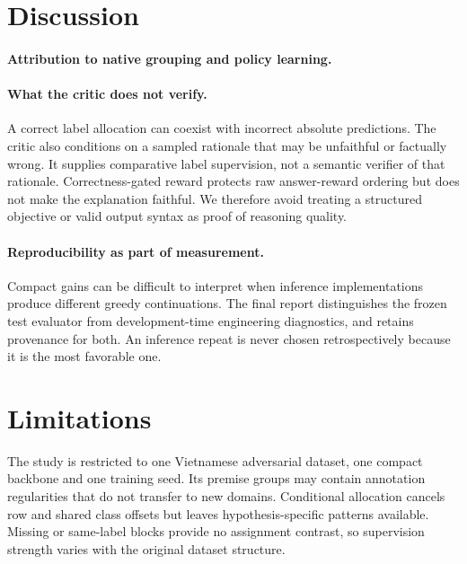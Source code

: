 \documentclass[11pt]{article}
\begin{document}
\section{Discussion}
\paragraph{Attribution to native grouping and policy learning.}

\paragraph{What the critic does not verify.}
A correct label allocation can coexist with incorrect absolute predictions. The critic also conditions on a sampled rationale that may be unfaithful or factually wrong. It supplies comparative label supervision, not a semantic verifier of that rationale. Correctness-gated reward protects raw answer-reward ordering but does not make the explanation faithful. We therefore avoid treating a structured objective or valid output syntax as proof of reasoning quality.

\paragraph{Reproducibility as part of measurement.}
Compact gains can be difficult to interpret when inference implementations produce different greedy continuations. The final report distinguishes the frozen test evaluator from development-time engineering diagnostics, and retains provenance for both. An inference repeat is never chosen retrospectively because it is the most favorable one.

\section{Limitations}
The study is restricted to one Vietnamese adversarial dataset, one compact backbone and one training seed. Its premise groups may contain annotation regularities that do not transfer to new domains. Conditional allocation cancels row and shared class offsets but leaves hypothesis-specific patterns available. Missing or same-label blocks provide no assignment contrast, so supervision strength varies with the original dataset structure.
\end{document}
